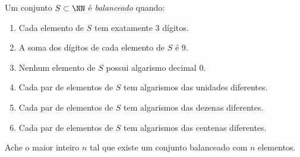 Um conjunto $S \subset \NN$ é \emph{balanceado} quando: 

\begin{enumerate}[label = --, itemsep = 0.5pt]
	\item Cada elemento de $S$ tem exatamente 3 dígitos.
	\item A soma dos dígitos de cada elemento de $S$ é $9$.
	\item Nenhum elemento de $S$ possui algarismo decimal $0$.
	\item Cada par de elementos de $S$ tem algarismos das unidades diferentes.	
	\item Cada par de elementos de $S$ tem algarismos das dezenas diferentes.
	\item Cada par de elementos de $S$ tem algarismos das centenas diferentes.
\end{enumerate}

Ache o maior inteiro $n$ tal que existe um conjunto balanceado com $n$ elementos.
